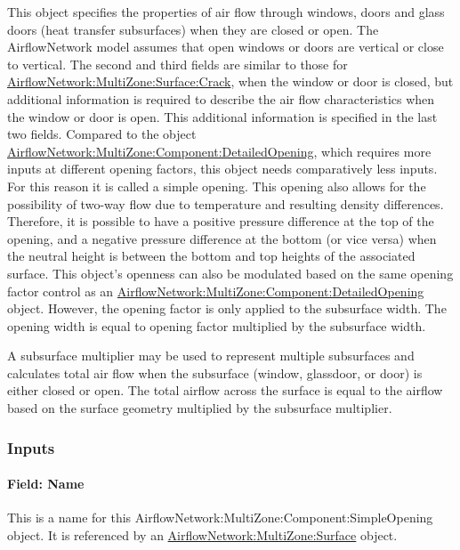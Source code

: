 This object specifies the properties of air flow through windows, doors and glass doors (heat transfer subsurfaces) when they are closed or open. The AirflowNetwork model assumes that open windows or doors are vertical or close to vertical. The second and third fields are similar to those for \hyperref[airflownetworkmultizonesurfacecrack]{AirflowNetwork:MultiZone:Surface:Crack}, when the window or door is closed, but additional information is required to describe the air flow characteristics when the window or door is open. This additional information is specified in the last two fields. Compared to the object \hyperref[airflownetworkmultizonecomponentdetailedopening]{AirflowNetwork:MultiZone:Component:DetailedOpening}, which requires more inputs at different opening factors, this object needs comparatively less inputs. For this reason it is called a simple opening. This opening also allows for the possibility of two-way flow due to temperature and resulting density differences. Therefore, it is possible to have a positive pressure difference at the top of the opening, and a negative pressure difference at the bottom (or vice versa) when the neutral height is between the bottom and top heights of the associated surface. This object's openness can also be modulated based on the same opening factor control as an \hyperref[airflownetworkmultizonecomponentdetailedopening]{AirflowNetwork:MultiZone:Component:DetailedOpening} object. However, the opening factor is only applied to the subsurface width. The opening width is equal to opening factor multiplied by the subsurface width.

A subsurface multiplier may be used to represent multiple subsurfaces and calculates total air flow when the subsurface (window, glassdoor, or door) is either closed or open. The total airflow across the surface is equal to the airflow based on the surface geometry multiplied by the subsurface multiplier.

\subsubsection{Inputs}\label{inputs-6-002}

\paragraph{Field: Name}\label{field-name-6-002}

This is a name for this AirflowNetwork:MultiZone:Component:SimpleOpening object. It is referenced by an \hyperref[airflownetworkmultizonesurface]{AirflowNetwork:MultiZone:Surface} object.

